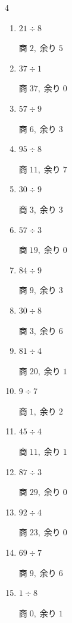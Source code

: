 \begin{multicols}{4}
\begin{enumerate}
  \item $21 \div 8$

        $商\; 2,\; 余り\; 5$

  \item $37 \div 1$

        $商\; 37,\; 余り\; 0$

  \item $57 \div 9$

        $商\; 6,\; 余り\; 3$

\columnbreak %

  \item $95 \div 8$

        $商\; 11,\; 余り\; 7$

  \item $30 \div 9$

        $商\; 3,\; 余り\; 3$

  \item $57 \div 3$

        $商\; 19,\; 余り\; 0$

  \item $84 \div 9$

        $商\; 9,\; 余り\; 3$

  \item $30 \div 8$

        $商\; 3,\; 余り\; 6$

  \item $81 \div 4$

        $商\; 20,\; 余り\; 1$

  \item $9 \div 7$

        $商\; 1,\; 余り\; 2$

  \item $45 \div 4$

        $商\; 11,\; 余り\; 1$

  \item $87 \div 3$

        $商\; 29,\; 余り\; 0$

  \item $92 \div 4$

        $商\; 23,\; 余り\; 0$

  \item $69 \div 7$

        $商\; 9,\; 余り\; 6$

  \item $1 \div 8$

        $商\; 0,\; 余り\; 1$


\end{enumerate}
\end{multicols}
